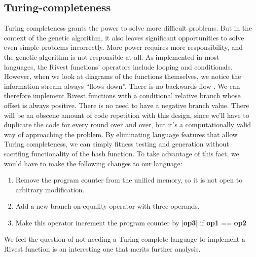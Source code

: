 \documentclass{article}
\begin{document}
\subsection{Turing-completeness}
Turing completeness grants the power to solve more difficult problems. But in the context of the genetic algorithm, it also leaves significant opportunities to solve even simple problems incorrectly. More power requires more responsibility, and the genetic algorithm is not responsible at all. As implemented in most languages, the Rivest functions' operators include looping and conditionals. However, when we look at diagrams of the functions themselves, we notice the information stream always ``flows down''. There is no backwards flow \cite{MD5Diagram}. We can therefore implement Rivest functions with a conditional relative branch whose offset is always positive. There is no need to have a negative branch value. There will be an obscene amount of code repetition with this design, since we'll have to duplicate the code for every round over and over, but it's a computationally valid way of approaching the problem. By eliminating language features that allow Turing completeness, we can simply fitness testing and generation without sacrifing functionality of the hash function. To take advantage of this fact, we would have to make the following changes to our language:
\begin{enumerate}
\item Remove the program counter from the unified memory, so it is not open to arbitrary modification.
\item Add a new branch-on-equality operator with three operands.
\item Make this operator increment the program counter by |\textbf{op3}| if \textbf{op1} == \textbf{op2}
\end{enumerate}

We feel the question of not needing a Turing-complete language to implement a Rivest function is an interesting one that merits further analysis.
\end{document}
